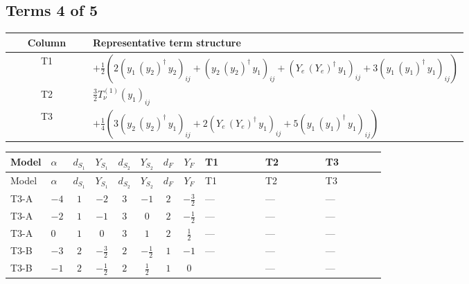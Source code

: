 \documentclass[8pt]{article}
\begin{document}
\begin{landscape}
\subsection*{Terms 4 of 5}
\begin{center}
\begin{tabular}{@{}c >{\raggedright\arraybackslash}p{0.82\linewidth}@{}}
\toprule
Column & Representative term structure \\
\midrule
T1 & \(\displaystyle +\frac{1}{2} (2 \left({y_1}\,\left({y_2}\right)^{\dagger}\,{y_2}\right)_{ij}+\left({y_2}\,\left({y_2}\right)^{\dagger}\,{y_1}\right)_{ij}+\left({Y_e}\,\left({Y_e}\right)^{\dagger}\,{y_1}\right)_{ij}+3 \left({y_1}\,\left({y_1}\right)^{\dagger}\,{y_1}\right)_{ij})\) \\
\midrule
T2 & \(\displaystyle \frac{3}{2} T_{\nu}^{(1)} \left({y_1}\right)_{ij}\) \\
\midrule
T3 & \(\displaystyle +\frac{1}{4} (3 \left({y_2}\,\left({y_2}\right)^{\dagger}\,{y_1}\right)_{ij}+2 \left({Y_e}\,\left({Y_e}\right)^{\dagger}\,{y_1}\right)_{ij}+5 \left({y_1}\,\left({y_1}\right)^{\dagger}\,{y_1}\right)_{ij})\) \\
\midrule
\bottomrule
\end{tabular}
\end{center}
\smallskip
\tiny
\begin{longtable}{@{}llcccccc >{\raggedright\arraybackslash}p{0.21\linewidth} >{\raggedright\arraybackslash}p{0.21\linewidth} >{\raggedright\arraybackslash}p{0.21\linewidth}@{}}
\toprule
Model & $\alpha$ & $d_{S_1}$ & $Y_{S_1}$ & $d_{S_2}$ & $Y_{S_2}$ & $d_F$ & $Y_F$ & T1 & T2 & T3 \\
\midrule
\endfirsthead
\toprule
Model & $\alpha$ & $d_{S_1}$ & $Y_{S_1}$ & $d_{S_2}$ & $Y_{S_2}$ & $d_F$ & $Y_F$ & T1 & T2 & T3 \\
\midrule
\endhead
T3-A & $-4$ & $1$ & $-2$ & $3$ & $-1$ & $2$ & $-\frac{3}{2}$ & --- & --- & --- \\
\midrule
T3-A & $-2$ & $1$ & $-1$ & $3$ & $0$ & $2$ & $-\frac{1}{2}$ & --- & --- & --- \\
\midrule
T3-A & $0$ & $1$ & $0$ & $3$ & $1$ & $2$ & $\frac{1}{2}$ & --- & --- & --- \\
\midrule
T3-B & $-3$ & $2$ & $-\frac{3}{2}$ & $2$ & $-\frac{1}{2}$ & $1$ & $-1$ & --- & --- & --- \\
\midrule
T3-B & $-1$ & $2$ & $-\frac{1}{2}$ & $2$ & $\frac{1}{2}$ & $1$ & $0$ & \scriptsize\adjustbox{max width=\linewidth}{$\begin{gathered} +\frac{1}{2} (2 \left({y_1}\,\left({y_2}\right)^{\dagger}\,{y_2}\right)_{ij}+\left({y_2}\,\left({y_2}\right)^{\dagger}\,{y_1}\right)_{ij}+\left({Y_e}\,\left({Y_e}\right)^{\dagger}\,{y_1}\right)_{ij}+3 \left({y_1}\,\left({y_1}\right)^{\dagger}\,{y_1}\right)_{ij})\end{gathered}$} & --- & --- \\

\end{longtable}
\end{landscape}
\end{document}

